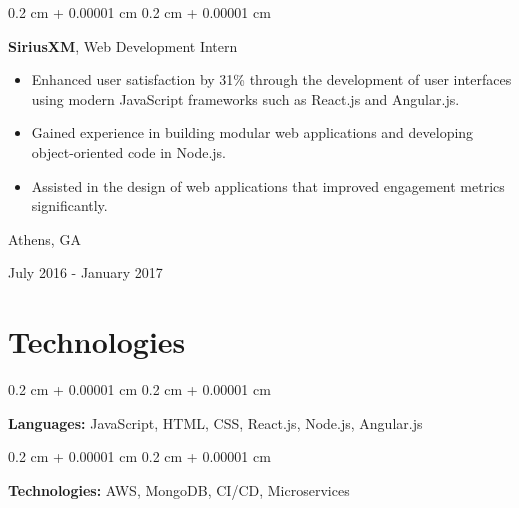 \documentclass[10pt, letterpaper]{article}
\newenvironment{highlights}{
    \begin{itemize}[
        topsep=0.10 cm,
        parsep=0.10 cm,
        partopsep=0pt,
        itemsep=0pt,
        leftmargin=0.4 cm + 10pt
    ]
}{
    \end{itemize}
} %
\newenvironment{onecolentry}{
    \begin{adjustwidth}{
        0.2 cm + 0.00001 cm
    }{
        0.2 cm + 0.00001 cm
    }
}{
    \end{adjustwidth}
} %
\newenvironment{twocolentry}[2][]{
    \onecolentry
    \def\secondColumn{#2}
    \setcolumnwidth{\fill, 4.5 cm}
    \begin{paracol}{2}
}{
    \switchcolumn \raggedleft \secondColumn
    \end{paracol}
    \endonecolentry
} %
\begin{document}
        \begin{twocolentry}{
            Athens, GA

        July 2016 - January 2017
        }
            \textbf{SiriusXM}, Web Development Intern
            \begin{highlights}
                \item Enhanced user satisfaction by 31\% through the development of user interfaces using modern JavaScript frameworks such as React.js and Angular.js.
                \item Gained experience in building modular web applications and developing object-oriented code in Node.js.
                \item Assisted in the design of web applications that improved engagement metrics significantly.
            \end{highlights}
        \end{twocolentry}




    
    \section{Technologies}



        
        \begin{onecolentry}
            \textbf{Languages:} JavaScript, HTML, CSS, React.js, Node.js, Angular.js
        \end{onecolentry}

        \vspace{0.2 cm}

        \begin{onecolentry}
            \textbf{Technologies:} AWS, MongoDB, CI/CD, Microservices
        \end{onecolentry}


    
\end{document}
